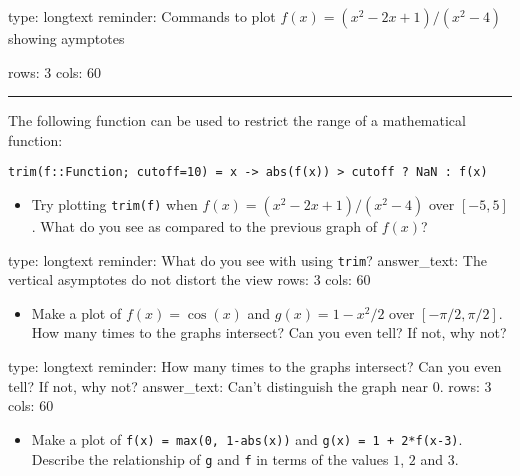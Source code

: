 \documentclass[12pt]{article}
\begin{document}
\begin{answer}
type: longtext
reminder: Commands to plot \( f(x) = (x^2 - 2x + 1)/(x^2 - 4) \) showing aymptotes

rows: 3
cols: 60
\end{answer}

\begin{center}\rule{3in}{0.4pt}\end{center}

The following function can be used to restrict the range of a
mathematical function:



\begin{verbatim}
trim(f::Function; cutoff=10) = x -> abs(f(x)) > cutoff ? NaN : f(x)
\end{verbatim}
\begin{itemize}
\itemsep1pt\parskip0pt
\item
  Try plotting \texttt{trim(f)} when $f(x) = (x^2 - 2x + 1)/(x^2 - 4)$
  over $[-5, 5]$. What do you see as compared to the previous graph of
  $f(x)$?
\end{itemize}

\begin{answer}
type: longtext
reminder: What do you see with using \verb+trim+?
answer_text: The vertical asymptotes do not distort the view 
rows: 3
cols: 60
\end{answer}

\begin{itemize}
\itemsep1pt\parskip0pt
\item
  Make a plot of $f(x) = \cos(x)$ and $g(x) = 1 - x^2/2$ over
  $[-\pi/2, \pi/2]$. How many times to the graphs intersect? Can you
  even tell? If not, why not?
\end{itemize}

\begin{answer}
type: longtext
reminder: How many times to the graphs intersect? Can you even tell? If not, why not?
answer_text: Can't distinguish the graph near 0. 
rows: 3
cols: 60
\end{answer}

\begin{itemize}
\itemsep1pt\parskip0pt
\item
  Make a plot of \texttt{f(x) = max(0, 1-abs(x))} and
  \texttt{g(x) = 1 +   2*f(x-3)}. Describe the relationship of
  \texttt{g} and \texttt{f} in terms of the values $1$, $2$ and $3$.
\end{itemize}
\end{document}
